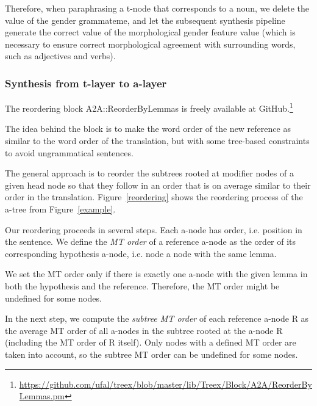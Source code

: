 \documentclass[11pt]{article}
\def\Fref#1{Figure~\ref{#1}}
\def\footurl#1{\footnote{\url{#1}}}
\begin{document}
Therefore, when paraphrasing a t-node that corresponds to a noun, we delete 
the value of the gender grammateme, and let the subsequent synthesis pipeline 
generate the correct value of the morphological gender feature value (which is 
necessary to ensure correct morphological agreement with surrounding words, 
such as adjectives and verbs).

\subsubsection{Synthesis from t-layer to a-layer}
The reordering block A2A::ReorderByLemmas is freely available at 
GitHub.\footurl{https://github.com/ufal/treex/blob/master/lib/Treex/Block/A2A/ReorderByLemmas.pm}

The idea behind the block is to make the word order of the new reference as 
similar to the word order of the translation, but with some tree-based 
constraints to avoid ungrammatical sentences. 

The general approach is to reorder the subtrees rooted at modifier nodes of a 
given head node so that they follow in an order that is on average similar to 
their order in the translation. \Fref{reordering} shows the reordering process 
of the a-tree from \Fref{example}.


Our reordering proceeds in several steps. Each a-node has order, i.e. position 
in the sentence.  We define the \emph{MT order} of a reference a-node as the 
order of its corresponding hypothesis a-node, i.e. node a node with the same 
lemma. 

We set the MT order only if there is exactly one a-node with the given lemma 
in both the hypothesis and the reference. Therefore, the MT order might be 
undefined for some nodes.

In the next step, we compute the \emph{subtree MT order} of each reference 
a-node R as the average MT order of all a-nodes in the subtree rooted at the 
a-node R (including the MT order of R itself). Only nodes with a defined MT 
order are taken into account, so the subtree MT order can be undefined for 
some nodes. 
\end{document}
